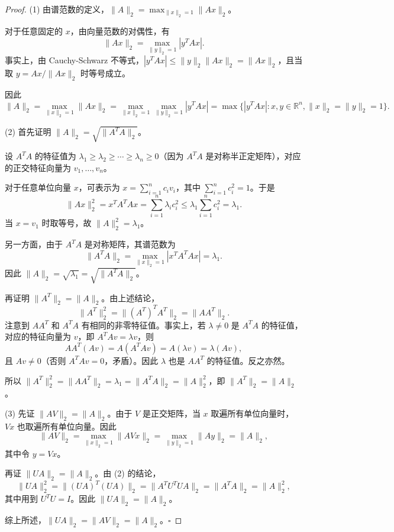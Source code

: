 \documentclass{article}
\begin{document}
\begin{proof}
  (1) 由谱范数的定义，$\|A\|_2 = \max_{\|x\|_2=1} \|Ax\|_2$。

  对于任意固定的 $x$，由向量范数的对偶性，有
  \[
    \|Ax\|_2 = \max_{\|y\|_2=1} |y^T Ax|.
  \]
  事实上，由 Cauchy-Schwarz 不等式，$|y^T Ax| \leq \|y\|_2 \|Ax\|_2 =
  \|Ax\|_2$，且当取 $y = Ax/\|Ax\|_2$ 时等号成立。

  因此
  \[
    \|A\|_2 = \max_{\|x\|_2=1} \|Ax\|_2 = \max_{\|x\|_2=1}
    \max_{\|y\|_2=1} |y^T Ax| = \max\{ |y^{T}Ax| : x, y \in
    \mathbb{R}^n, \|x\|_2 = \|y\|_2 = 1 \}.
  \]

  (2) 首先证明 $\|A\|_2 = \sqrt{\|A^TA\|_2}$。

  设 $A^TA$ 的特征值为 $\lambda_1 \geq \lambda_2 \geq \cdots \geq \lambda_n
  \geq 0$（因为 $A^TA$ 是对称半正定矩阵），对应的正交特征向量为 $v_1, \ldots, v_n$。

  对于任意单位向量 $x$，可表示为 $x = \sum_{i=1}^n c_i v_i$，其中 $\sum_{i=1}^n c_i^2 = 1$。于是
  \[
    \|Ax\|_2^2 = x^T A^T A x = \sum_{i=1}^n \lambda_i c_i^2 \leq
    \lambda_1 \sum_{i=1}^n c_i^2 = \lambda_1.
  \]
  当 $x = v_1$ 时取等号，故 $\|A\|_2^2 = \lambda_1$。

  另一方面，由于 $A^TA$ 是对称矩阵，其谱范数为
  \[
    \|A^TA\|_2 = \max_{\|x\|_2=1} |x^T A^T A x| = \lambda_1.
  \]
  因此 $\|A\|_2 = \sqrt{\lambda_1} = \sqrt{\|A^TA\|_2}$。

  再证明 $\|A^T\|_2 = \|A\|_2$。由上述结论，
  \[
    \|A^T\|_2^2 = \|(A^T)^T A^T\|_2 = \|AA^T\|_2.
  \]
  注意到 $AA^T$ 和 $A^TA$ 有相同的非零特征值。事实上，若 $\lambda \neq 0$ 是 $A^TA$
  的特征值，对应的特征向量为 $v$，即 $A^TAv = \lambda v$，则
  \[
    AA^T(Av) = A(A^TAv) = A(\lambda v) = \lambda (Av),
  \]
  且 $Av \neq 0$（否则 $A^TAv = 0$，矛盾）。因此 $\lambda$ 也是 $AA^T$ 的特征值。反之亦然。

  所以 $\|A^T\|_2^2 = \|AA^T\|_2 = \lambda_1 = \|A^TA\|_2 =
  \|A\|_2^2$，即 $\|A^T\|_2 = \|A\|_2$。

  (3) 先证 $\|AV\|_2 = \|A\|_2$。由于 $V$ 是正交矩阵，当 $x$ 取遍所有单位向量时，$Vx$ 也取遍所有单位向量。因此
  \[
    \|AV\|_2 = \max_{\|x\|_2=1} \|AVx\|_2 = \max_{\|y\|_2=1} \|Ay\|_2 = \|A\|_2,
  \]
  其中令 $y = Vx$。

  再证 $\|UA\|_2 = \|A\|_2$。由 (2) 的结论，
  \[
    \|UA\|_2^2 = \|(UA)^T(UA)\|_2 = \|A^T U^T U A\|_2 = \|A^T A\|_2 = \|A\|_2^2,
  \]
  其中用到 $U^TU = I$。因此 $\|UA\|_2 = \|A\|_2$。

  综上所述，$\|UA\|_2 = \|AV\|_2 = \|A\|_2$。\hfill $\square$
\end{proof}
\end{document}
